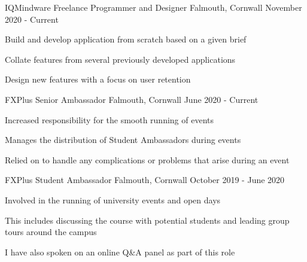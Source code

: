

\begin{cventries}
    \cventry
        {IQMindware}
        {Freelance Programmer and Designer}
        {Falmouth, Cornwall}
        {November 2020 - Current}
        {
            \begin{cvitems}
                \item Build and develop application from scratch based on a given brief
                \item Collate features from several previously developed applications 
                \item Design new features with a focus on user retention
            \end{cvitems}
        }

    \cventry
        {FXPlus}
        {Senior Ambassador}
        {Falmouth, Cornwall}
        {June 2020 - Current}
        {
            \begin{cvitems}
                \item Increased responsibility for the smooth running of events
                \item Manages the distribution of Student Ambassadors during events
                \item Relied on to handle any complications or problems that arise during an event
            \end{cvitems}
        }

    \cventry
        {FXPlus}
        {Student Ambassador}
        {Falmouth, Cornwall}
        {October 2019 - June 2020}
        {
            \begin{cvitems}
                \item Involved in the running of university events and open days
                \item This includes discussing the course with potential students and leading group tours around the campus
                \item I have also spoken on an online Q\&A panel as part of this role
            \end{cvitems}
        }     
\end{cventries}